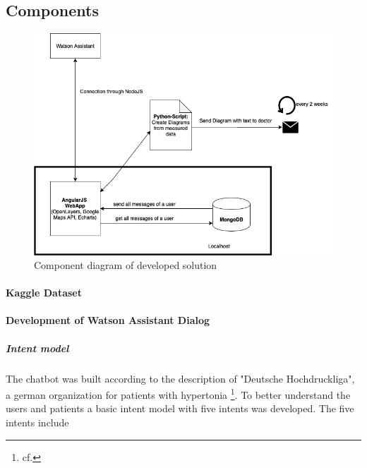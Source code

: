 \subsection{Components}
\begin{figure}[htbp]
	\centering
	\includegraphics[width=1\textwidth]{images/components.png}
	\caption{Component diagram of developed solution}
	\label{ncbi_query}
\end{figure}

\paragraph{Kaggle Dataset}
\paragraph{Development of Watson Assistant Dialog}

\subparagraph{Intent model}

The chatbot was built according to the description of "Deutsche Hochdruckliga", a german organization for patients with hypertonia \footnote{cf.\autocite{hochdruckliga}}.
To better understand the users and patients a basic intent model with five intents was developed. 
The five intents include 


